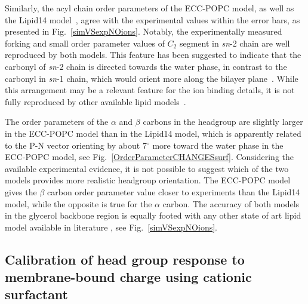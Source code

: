 \documentclass[aip,jcp,twocolumn]{revtex4}
\begin{document}
Similarly, the acyl chain order parameters of the ECC-POPC model, as well as the Lipid14 model~\cite{dickson14}, agree with the experimental values within the error bars, as presented in Fig.~\ref{simVSexpNOions}. Notably, the experimentally measured forking and small order parameter values of $C_2$ segment in {\it sn}-2 chain are well reproduced by both models. This feature has been suggested to indicate that the carbonyl of {\it sn}-2 chain is directed towards the water phase, in contrast to the carbonyl in {\it sn}-1 chain, which would orient more along the bilayer plane~\cite{seelig75,schindler75,gawrisch92}.
While this arrangement may be a relevant feature for the ion binding details, it is not fully reproduced by other available lipid models~\cite{ollila16}.

The order parameters of the $\alpha$ and $\beta$ carbons in the headgroup are slightly larger in the ECC-POPC model than in the Lipid14 model, which is apparently related to the P-N vector orienting by about 7$^{\circ}$ more toward the water phase in the ECC-POPC model, see Fig.~\ref{OrderParameterCHANGESsurf}. Considering the available experimental evidence, it is not possible to suggest which of the two models provides more realistic headgroup orientation. The ECC-POPC model gives the $\beta$ carbon order parameter value closer to experiments than the Lipid14 model, while the opposite is true for the $\alpha$ carbon. The accuracy of both models in the glycerol backbone region is equally footed with any other state of art lipid model available in literature \cite{botan15}, see Fig.~\ref{simVSexpNOions}.



\subsection{Calibration of head group response to membrane-bound charge using cationic surfactant}\label{section:boundCHARGE}
\end{document}
